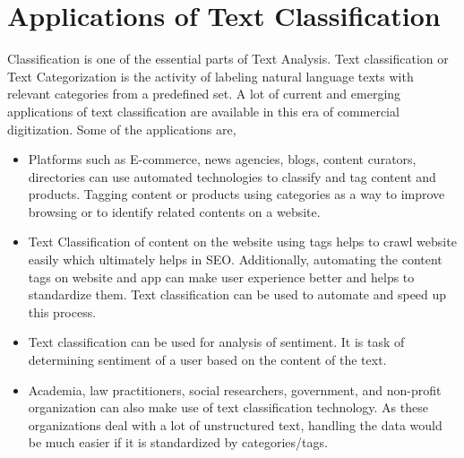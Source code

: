 \section{Applications of Text Classification}
Classification is one of the essential parts of Text Analysis. Text classification or Text Categorization is the activity of labeling natural language texts with relevant categories from a predefined set. A lot of current and emerging applications of text classification are available in this era of commercial digitization. Some of the applications are,
\begin{itemize}
    \item Platforms such as E-commerce, news agencies, blogs, content curators, directories can use automated technologies to classify and tag content and products. Tagging content or products using categories as a way to improve browsing or to identify related contents on a website.
    
    
    \item Text Classification of content on the website using tags helps to crawl website easily which ultimately helps in SEO. Additionally, automating the content tags on website and app can make user experience better and helps to standardize them. Text classification can be used to automate and speed up this process.
    
    \item Text classification can be used for analysis of sentiment. It is task of determining sentiment of a user based on the content of the text.
    
    \item Academia, law practitioners, social researchers, government, and non-profit organization can also make use of text classification technology. As these organizations deal with a lot of unstructured text, handling the data would be much easier if it is standardized by categories/tags.
    
\end{itemize}

